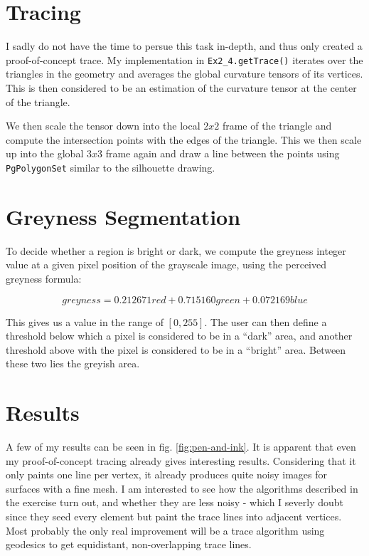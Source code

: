 \documentclass[a4paper,10pt,notitlepage]{scrreprt}
\begin{document}
\section{Tracing}

I sadly do not have the time to persue this task in-depth, and thus only
created a proof-of-concept trace. My implementation in
\texttt{Ex2\_4.getTrace()} iterates over the triangles in the geometry and
averages the global curvature tensors of its vertices. This is then considered
to be an estimation of the curvature tensor at the center of the triangle.

We then scale the tensor down into the local $2x2$ frame of the triangle and
compute the intersection points with the edges of the triangle. This we then
scale up into the global $3x3$ frame again and draw a line between the points
using \texttt{PgPolygonSet} similar to the silhouette drawing.

\section{Greyness Segmentation}

To decide whether a region is bright or dark, we compute the greyness integer
value at a given pixel position of the grayscale image, using the perceived
greyness formula:

\begin{equation}
 greyness = 0.212671 red + 0.715160 green + 0.072169 blue
\end{equation}

This gives us a value in the range of $[0, 255]$. The user can then define a
threshold below which a pixel is considered to be in a ``dark'' area, and
another threshold above with the pixel is considered to be in a ``bright''
area. Between these two lies the greyish area.

\section{Results}

A few of my results can be seen in fig. \ref{fig:pen-and-ink}. It is apparent
that even my proof-of-concept tracing already gives interesting results.
Considering that it only paints one line per vertex, it already produces
quite noisy images for surfaces with a fine mesh. I am interested to see how
the algorithms described in the exercise turn out, and whether they are less
noisy - which I severly doubt since they seed every element but paint the trace
lines into adjacent vertices. Most probably the only real improvement will be a
trace algorithm using geodesics to get equidistant, non-overlapping trace lines.
\end{document}
